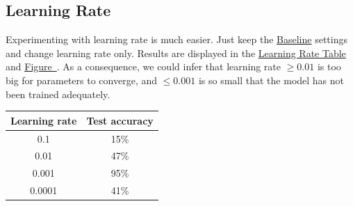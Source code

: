 \documentclass{article}
\begin{document}
\subsection{Learning Rate}
Experimenting with learning rate is much easier. Just keep the \hyperref[base]{Baseline} settings and change learning rate only. Results are displayed in the \hyperref[tab-3]{Learning Rate Table} and \hyperref[fig-3]{Figure~}. As a consequence, we could infer that learning rate $\ge 0.01$ is too big for parameters to converge, and $\le 0.001$ is so small that the model has not been trained adequately.
\begin{center}
	\label{tab-3}
	\begin{tabular}{cc}
		\toprule
		Learning rate & Test accuracy \\
		\midrule
		0.1 & 15\% \\
		0.01 & 47\% \\
		0.001 & 95\% \\
		0.0001 & 41\% \\
		\bottomrule
	\end{tabular}
\end{center}
\end{document}
